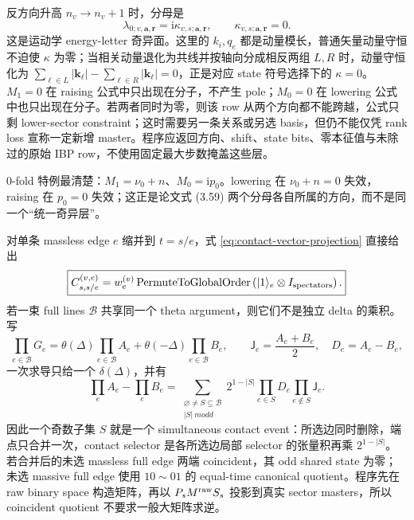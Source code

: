 \documentclass[11pt,a4paper]{ctexart}
\newcommand{\ii}{\mathrm i}
\begin{document}
反方向升高 $n_v\to n_v+1$ 时，分母是
\begin{equation}
 \lambda_{0;v,\bm a,\bm r}
 =\ii\kappa_{v,s;\bm a,\bm r},
 \qquad
 \kappa_{v,s;\bm a,\bm r}=0.
 \label{eq:M0-raising-resonance}
\end{equation}
这是运动学 energy-letter 奇异面。这里的 $k_i,q_e$ 都是动量模长，普通矢量动量守恒不迫使 $\kappa$ 为零；当相关动量退化为共线并按轴向分成相反两组 $L,R$ 时，动量守恒化为 $\sum_{\ell\in L}|\bm k_\ell|-\sum_{\ell\in R}|\bm k_\ell|=0$，正是对应 state 符号选择下的 $\kappa=0$。$M_1=0$ 在 raising 公式中只出现在分子，不产生 pole；$M_0=0$ 在 lowering 公式中也只出现在分子。若两者同时为零，则该 row 从两个方向都不能跨越，公式只剩 lower-sector constraint；这时需要另一条关系或另选 basis，但仍不能仅凭 rank loss 宣称一定新增 master。程序应返回方向、shift、state bits、零本征值与未除过的原始 IBP row，不使用固定最大步数掩盖这些层。

0-fold 特例最清楚：$M_1=\nu_0+n$、$M_0=\ii p_0$。lowering 在 $\nu_0+n=0$ 失效，raising 在 $p_0=0$ 失效；这正是论文式 (3.59) 两个分母各自所属的方向，而不是同一个“统一奇异层”。

对单条 massless edge $e$ 缩并到 $t=s/e$，式 \eqref{eq:contact-vector-projection} 直接给出
\begin{equation}
 \boxed{
 C_{s,s/e}^{(v,e)}
 =w_e^{(v)}
 \operatorname{PermuteToGlobalOrder}
 \left(|1\rangle_e\otimes I_{\rm spectators}\right).
 }
 \label{eq:contact-injection}
\end{equation}
若一束 full lines $\mathcal B$ 共享同一个 theta argument，则它们不是独立 delta 的乘积。写
\begin{equation}
 \prod_{e\in\mathcal B}G_e
 =\theta(\Delta)\prod_{e\in\mathcal B}A_e
 +\theta(-\Delta)\prod_{e\in\mathcal B}B_e,
 \qquad
 \mathsf J_e=\frac{A_e+B_e}{2},\quad D_e=A_e-B_e,
\end{equation}
一次求导只给一个 $\delta(\Delta)$，并有
\begin{equation}
 \prod_eA_e-\prod_eB_e
 =\sum_{\substack{\varnothing\neq S\subseteq\mathcal B\\|S|\ {
m odd}}}
 2^{1-|S|}\prod_{e\in S}D_e\prod_{e\notin S}\mathsf J_e.
 \label{eq:common-theta-odd-subsets}
\end{equation}
因此一个奇数子集 $S$ 就是一个 simultaneous contact event：所选边同时删除，端点只合并一次，contact selector 是各所选边局部 selector 的张量积再乘 $2^{1-|S|}$。若合并后的未选 massless full edge 两端 coincident，其 odd shared state 为零；未选 massive full edge 使用 $10\sim01$ 的 equal-time canonical quotient。程序先在 raw binary space 构造矩阵，再以 $P_sM^{\rm raw}S_s$ 投影到真实 sector masters，所以 coincident quotient 不要求一般大矩阵求逆。
\end{document}
